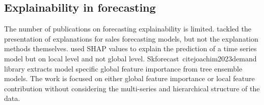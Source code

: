 
\subsection{Explainability in forecasting}\label{subsec:explainability-in-forecasting}
The number of publications on forecasting explainability is limited.
\cite{fahse2022explanation} tackled the presentation of explanations for sales forecasting models, but not the explanation methods themselves.
\cite{Saluja_2021} used SHAP values to explain the prediction of a time series model but on local level and not global level.
Skforecast~cite{joachim2023demand} library extracts model specific global feature importance from tree ensemble models.
The work is focused on either global feature importance or local feature contribution without considering the multi-series and hierarchical structure of the data.